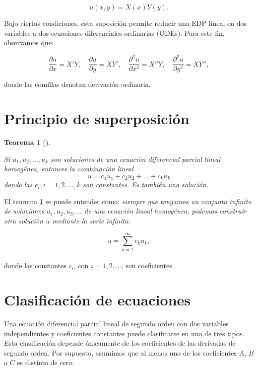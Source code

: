 \documentclass[
  spanish,
  us-letterpaper,
]{scrreprt}
\theoremstyle{definition}
\theoremstyle{plain}
\newtheorem{theorem}{Teorema}[chapter]
\theoremstyle{remark}
\begin{document}
\[
u(x, y) = X(x)Y(y).
\]

Bajo ciertas condiciones, esta suposición permite reducir una EDP lineal
en dos variables a dos ecuaciones diferenciales ordinarias (ODEs). Para
este fin, observamos que:

\[
\dfrac{\partial u}{\partial x} = X'Y, \quad
\dfrac{\partial u}{\partial y} = XY', \quad
\dfrac{\partial^2 u}{\partial x^2} = X''Y, \quad
\dfrac{\partial^2 u}{\partial y^2} = XY'',
\]

donde las comillas denotan derivación ordinaria.

\section{Principio de
superposición}\label{principio-de-superposiciuxf3n}

\begin{theorem}[]\protect\hypertarget{thm-superposition}{}\label{thm-superposition}

Si \(u_1 , u_2 , \dots , u_k\) son soluciones de una ecuación
diferencial parcial lineal homogénea, entonces la combinación lineal \[
u = c_1u_1 + c_2u_2 + \dots + c_ku_k
\] donde las \(c_i, i=1,2,\dots,k\) son constantes. Es también una
solución.

\end{theorem}

El teorema \ref{thm-superposition} se puede entender como: \emph{siempre
que tengamos un conjunto infinito de soluciones
\(u_1, u_2, u_3, \ldots\) de una ecuación lineal homogénea, podemos
construir otra solución \(u\) mediante la serie infinita}:

\[  
u = \sum_{k=1}^{\infty} c_k u_k,  
\]\\
donde las constantes \(c_i\), con \(i = 1, 2, \ldots\), son
coeficientes.

\section{Clasificación de
ecuaciones}\label{clasificaciuxf3n-de-ecuaciones}

Una ecuación diferencial parcial lineal de segundo orden con dos
variables independientes y coeficientes constantes puede clasificarse en
uno de tres tipos. Esta clasificación depende únicamente de los
coeficientes de las derivadas de segundo orden. Por supuesto, asumimos
que al menos uno de los coeficientes \(A\), \(B\) o \(C\) es distinto de
cero.
\end{document}
